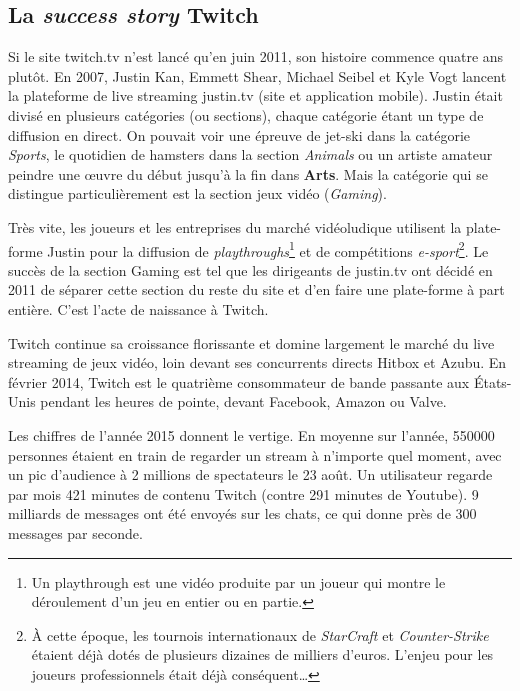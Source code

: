 \documentclass[a4paper]{article}
\begin{document}
\subsection{La \textit{success story} Twitch}
Si le site twitch.tv n'est lancé qu'en juin 2011, son histoire commence quatre ans plutôt. En 2007, Justin Kan, Emmett Shear, Michael Seibel et Kyle Vogt lancent la plateforme de live streaming justin.tv (site et application mobile). Justin était divisé en plusieurs catégories (ou sections), chaque catégorie étant un type de diffusion en direct. On pouvait voir une épreuve de jet-ski dans la catégorie \textit{Sports}, le quotidien de hamsters dans la section \textit{Animals} ou un artiste amateur peindre une œuvre du début jusqu'à la fin dans \textbf{Arts}. Mais la catégorie qui se distingue particulièrement est la section jeux vidéo (\textit{Gaming}).

Très vite, les joueurs et les entreprises du marché vidéoludique utilisent la plate-forme Justin pour la diffusion de \textit{playthroughs}\footnote{Un playthrough est une vidéo produite par un joueur qui montre le déroulement d'un jeu en entier ou en partie.} et de compétitions \textit{e-sport}\footnote{À cette époque, les tournois internationaux de \textit{StarCraft} et \textit{Counter-Strike} étaient déjà dotés de plusieurs dizaines de milliers d'euros. L'enjeu pour les joueurs professionnels était déjà conséquent\ldots}. Le succès de la section Gaming est tel que les dirigeants de justin.tv ont décidé en 2011 de séparer cette section du reste du site et d'en faire une plate-forme à part entière. C'est l'acte de naissance à Twitch.

Twitch continue sa croissance florissante et domine largement le marché du live streaming de jeux vidéo, loin devant ses concurrents directs Hitbox et Azubu. En février 2014, Twitch est le quatrième consommateur de bande passante aux États-Unis pendant les heures de pointe, devant Facebook, Amazon ou Valve.


Les chiffres de l'année 2015 donnent le vertige. En moyenne sur l'année, 550000 personnes étaient en train de regarder un stream à n'importe quel moment, avec un pic d'audience à 2 millions de spectateurs le 23 août. Un utilisateur regarde par mois 421 minutes de contenu Twitch (contre 291 minutes de Youtube). 9 milliards de messages ont été envoyés sur les chats, ce qui donne près de 300 messages par seconde.
\end{document}
